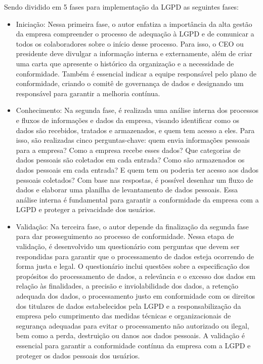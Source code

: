 \documentclass[
	12pt,				%
	openright,			%
	oneside,			%
	a4paper,			%
	english,			%
	french,				%
	spanish,			%
	brazil,				%
	]{abntex2}
\begin{document}
Sendo dividido em 5 fases para implementação da LGPD as seguintes fases: 
\begin{itemize}
\item Iniciação: Nessa primeira fase, o autor enfatiza a importância da alta gestão da empresa compreender o processo de adequação à LGPD e de comunicar a todos os colaboradores sobre o início desse processo. Para isso, o CEO ou presidente deve divulgar a informação interna e externamente, além de criar uma carta que apresente o histórico da organização e a necessidade de conformidade. Também é essencial indicar a equipe responsável pelo plano de conformidade, criando o comitê de governança de dados e designando um responsável para garantir a melhoria contínua.
\item  Conhecimento: Na segunda fase, é realizada uma análise interna dos processos e fluxos de informações e dados da empresa, visando identificar como os dados são recebidos, tratados e armazenados, e quem tem acesso a eles. Para isso, são realizadas cinco perguntas-chave: quem envia informações pessoais para a empresa? Como a empresa recebe esses dados? Que categorias de dados pessoais são coletados em cada entrada? Como são armazenados os dados pessoais em cada entrada? E quem tem ou poderia ter acesso aos dados pessoais coletados? Com base nas respostas, é possível desenhar um fluxo de dados e elaborar uma planilha de levantamento de dados pessoais. Essa análise interna é fundamental para garantir a conformidade da empresa com a LGPD e proteger a privacidade dos usuários.
\item Validação: Na terceira fase, o autor depende da finalização da segunda fase para dar prosseguimento ao processo de conformidade. Nessa etapa de validação, é desenvolvido um questionário com perguntas que devem ser respondidas para garantir que o processamento de dados esteja ocorrendo de forma justa e legal. O questionário inclui questões sobre a especificação dos propósitos do processamento de dados, a relevância e o excesso dos dados em relação às finalidades, a precisão e inviolabilidade dos dados, a retenção adequada dos dados, o processamento justo em conformidade com os direitos dos titulares de dados estabelecidos pela LGPD e a responsabilização da empresa pelo cumprimento das medidas técnicas e organizacionais de segurança adequadas para evitar o processamento não autorizado ou ilegal, bem como a perda, destruição ou danos aos dados pessoais. A validação é essencial para garantir a conformidade contínua da empresa com a LGPD e proteger os dados pessoais dos usuários.


\end{itemize}
\end{document}
